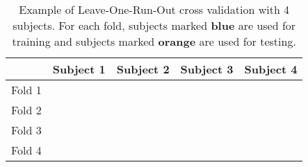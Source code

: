 \begin{table}[h]
    \centering
    \begin{tabular}{lcccc}
        \toprule
               & Subject 1 & Subject 2 & Subject 3 & Subject 4 \\
        \midrule
        Fold 1 & \cellcolor{test}     & \multicolumn{3}{c}{\cellcolor{train}} \\
        Fold 2 & \cellcolor{train} & \cellcolor{test}     & \multicolumn{2}{c}{\cellcolor{train}     } \\
        Fold 3 & \multicolumn{2}{c}{\cellcolor{train}     } & \cellcolor{test}     & \cellcolor{train} \\
        Fold 4 & \multicolumn{3}{c}{\cellcolor{train}} & \cellcolor{test}     \\
        \bottomrule
    \end{tabular}
    \caption{Example of Leave-One-Run-Out cross validation with 4 subjects. For each fold, subjects marked \textcolor{NavyBlue}{\textbf{blue}} are used for training and subjects marked \textcolor{BurntOrange}{\textbf{orange}} are used for testing.}\label{table:loro}
\end{table}
